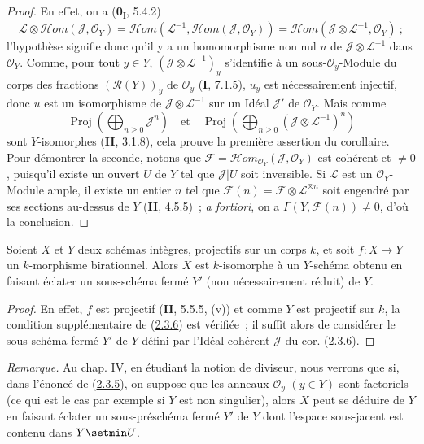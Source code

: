 \begin{proof}
En effet, on a (\textbf{0}\textsubscript{I}, 5.4.2)
\[
\mathcal L\otimes\mathcal{H}om(\mathcal J,\mathcal O_Y)
=\mathcal{H}om(\mathcal L^{-1},\mathcal{H}om(\mathcal J,\mathcal O_Y))
=\mathcal{H}om(\mathcal J\otimes\mathcal L^{-1},\mathcal O_Y)~;
\]
l'hypothèse signifie donc qu'il y a un homomorphisme non nul $u$ de
$\mathcal J\otimes\mathcal L^{-1}$ dans $\mathcal O_Y$. Comme, pour tout
$y\in Y$, $(\mathcal J\otimes\mathcal L^{-1})_y$ s'identifie à un
sous-$\mathcal O_y$-Module du corps des fractions $(\mathcal R(Y))_y$ de
$\mathcal O_y$ (\textbf{I}, 7.1.5), $u_y$ est nécessairement injectif, donc $u$
est un isomorphisme de $\mathcal J\otimes\mathcal L^{-1}$ sur un Idéal
$\mathcal J'$ de $\mathcal O_Y$. Mais comme
\[
\operatorname{Proj}\left(\bigoplus_{n\geq0}\mathcal J^n\right)
\quad\text{et}\quad
\operatorname{Proj}\left(
\bigoplus_{n\geq0}(\mathcal J\otimes\mathcal L^{-1})^n\right)
\]
sont $Y$-isomorphes (\textbf{II}, 3.1.8), cela prouve la première assertion du
corollaire. Pour démontrer la seconde, notons que
$\mathcal F=\mathcal{H}om_{\mathcal O_Y}(\mathcal J,\mathcal O_Y)$ est
cohérent et $\neq0$, puisqu'il existe un ouvert $U$ de $Y$ tel que
$\mathcal J|U$ soit inversible. Si $\mathcal L$ est un
$\mathcal O_Y$-Module ample, il existe un entier $n$ tel que
$\mathcal F(n)=\mathcal F\otimes\mathcal L^{\otimes n}$ soit engendré par
ses sections au-dessus de $Y$ (\textbf{II}, 4.5.5)~; \emph{a fortiori}, on a
$\Gamma(Y,\mathcal F(n))\neq0$, d'où la conclusion.
\end{proof}

\begin{corollary}[2.3.7]
\label{III.2.3.7-fr}
Soient $X$ et $Y$ deux schémas intègres, projectifs sur un corps $k$, et
soit $f:X\to Y$ un $k$-morphisme birationnel. Alors $X$ est $k$-isomorphe
à un $Y$-schéma obtenu en faisant éclater un sous-schéma fermé $Y'$
(non nécessairement réduit) de $Y$.
\end{corollary}

\begin{proof}
En effet, $f$ est projectif (\textbf{II}, 5.5.5, (v)) et comme $Y$ est projectif
sur $k$, la condition supplémentaire de
(\hyperref[III.2.3.6-fr]{2.3.6}) est vérifiée~; il suffit alors de
considérer le sous-schéma fermé $Y'$ de $Y$ défini par l'Idéal cohérent
$\mathcal J$ du cor. (\hyperref[III.2.3.6-fr]{2.3.6}).
\end{proof}

\begin{env}[2.3.8]
\label{III.2.3.8-fr}
\emph{Remarque.} Au chap. IV, en étudiant la notion de diviseur, nous
verrons que si, dans l'énoncé de
(\hyperref[III.2.3.5-fr]{2.3.5}), on suppose que les anneaux
$\mathcal O_y$ $(y\in Y)$ sont factoriels (ce qui est le cas par exemple
si $Y$ est non singulier), alors $X$ peut se déduire de $Y$ en faisant
éclater un sous-préschéma fermé $Y'$ de $Y$ dont l'espace sous-jacent est
contenu dans $Y\setmin U$.
\end{env}

